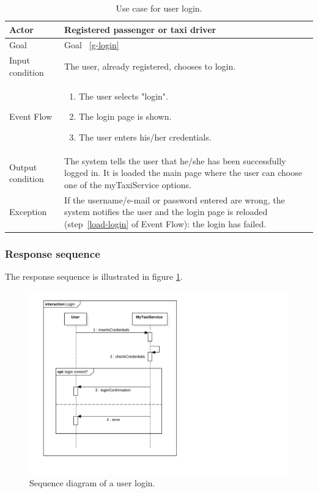 \begin{table}
\begin{center}
\begin{tabular}{| l | p{} |}
\hline
Actor & Registered passenger or taxi driver \\
\hline
Goal & Goal ~\ref{g-login}
\\
\hline
Input condition & The user, already registered, chooses to login.  \\
\hline
Event Flow & \begin{enumerate}
	\item The user selects "login".
	\item The login page is shown. \label{load-login}
	\item The user enters his/her credentials.
	\end{enumerate}
\\
\hline
Output condition & The system tells the user that he/she has been successfully logged in.
It is loaded the main page where the user can choose one of the myTaxiService options. \\
\hline

Exception & If the username/e-mail or password entered are wrong, the system notifies the user and the login page is reloaded (step~\ref{load-login} of Event Flow): the login has failed. 

	
 \\
\hline
\end{tabular}
\end{center}
\caption{Use case for user login.}
\label{usecase-login}
\end{table}





\subsubsection{Response sequence}
The response sequence is illustrated in figure \ref{fig:sequence-login}.
\begin{figure}
\includegraphics[width=\textwidth]{diagrams/sequence_login.pdf}
\caption{Sequence diagram of a user login.}
\label{fig:sequence-login}
\end{figure}

